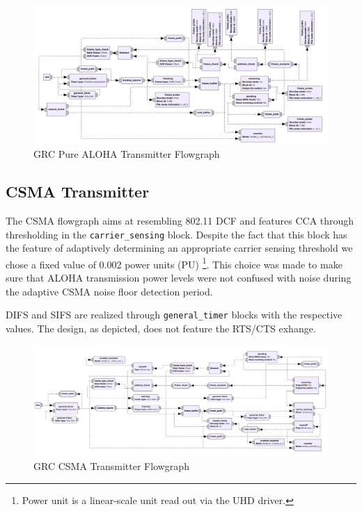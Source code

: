 \begin{figure}
	\label{fig:grc-aloha-sender}
	\begin{center}
		\includegraphics[width=\textwidth]{pictures/grc_aloha_transmitter_flowgraph}
\end{center}
\caption{GRC Pure ALOHA Transmitter Flowgraph}
\end{figure}

\subsection{CSMA Transmitter}

The CSMA flowgraph aims at resembling 802.11 DCF and features CCA through thresholding in the \texttt{carrier\_sensing} block. Despite the fact that this block has the feature of adaptively determining an appropriate carrier sensing threshold we chose a fixed value of 0.002 power units (PU) \footnote{Power unit is a linear-scale unit read out via the UHD driver.}. This choice was made to make sure that ALOHA transmission power levels were not confused with noise during the adaptive CSMA noise floor detection period. 

DIFS and SIFS are realized through \texttt{general\_timer} blocks with the respective values. The design, as depicted, does not feature the RTS/CTS exhange.

\begin{figure}
	\label{fig:grc-csma-sender}
	\begin{center}
		\includegraphics[width=\textwidth]{pictures/grc_csma_transmitter_flowgraph}
\end{center}
\caption{GRC CSMA Transmitter Flowgraph}
\end{figure}

